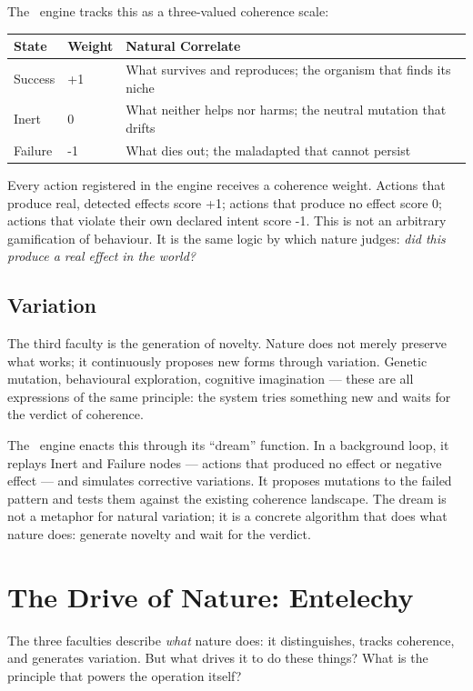 The \physis\ engine tracks this as a three-valued coherence scale:

\begin{center}
\begin{tabular}{@{}lll@{}}
\toprule
State & Weight & Natural Correlate \\
\midrule
Success & +1 & What survives and reproduces; the organism that finds its niche \\
Inert   & 0  & What neither helps nor harms; the neutral mutation that drifts \\
Failure & -1 & What dies out; the maladapted that cannot persist \\
\bottomrule
\end{tabular}
\end{center}

Every action registered in the engine receives a coherence weight. Actions that
produce real, detected effects score +1; actions that produce no effect score 0;
actions that violate their own declared intent score -1. This is not an arbitrary
gamification of behaviour. It is the same logic by which nature judges:
\emph{did this produce a real effect in the world?}

\subsection{Variation}

The third faculty is the generation of novelty. Nature does not merely preserve
what works; it continuously proposes new forms through variation. Genetic
mutation, behavioural exploration, cognitive imagination --- these are all
expressions of the same principle: the system tries something new and waits for
the verdict of coherence.

The \physis\ engine enacts this through its ``dream'' function. In a background
loop, it replays Inert and Failure nodes --- actions that produced no effect or
negative effect --- and simulates corrective variations. It proposes mutations
to the failed pattern and tests them against the existing coherence landscape.
The dream is not a metaphor for natural variation; it is a concrete algorithm
that does what nature does: generate novelty and wait for the verdict.

\section{The Drive of Nature: Entelechy}

The three faculties describe \emph{what} nature does: it distinguishes, tracks
coherence, and generates variation. But what drives it to do these things? What
is the principle that powers the operation itself?

